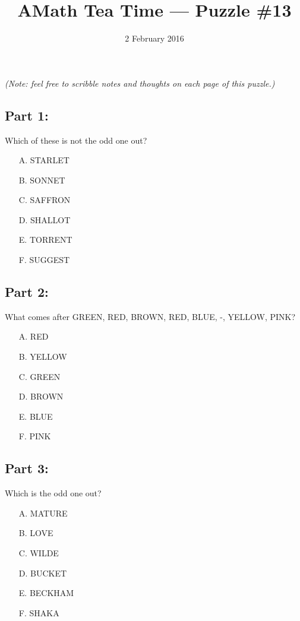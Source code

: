 \documentclass[12pt]{article}
\title{AMath Tea Time --- Puzzle \#13}
\author{}
\date{\vspace{-1cm}2 February 2016}
\begin{document}
\maketitle
{}

{\it \small (Note: feel free to scribble notes and thoughts on each page of this
  puzzle.)}

\subsection*{Part 1:}

Which of these is not the odd one out?
\begin{itemize}
  \item[A.] STARLET
  \item[B.] SONNET
  \item[C.] SAFFRON
  \item[D.] SHALLOT
  \item[E.] TORRENT
  \item[F.] SUGGEST
\end{itemize}

\pagebreak

\subsection*{Part 2:}

What comes after GREEN, RED, BROWN, RED, BLUE, -, YELLOW, PINK?

\begin{itemize}
  \item[A.] RED
  \item[B.] YELLOW
  \item[C.] GREEN
  \item[D.] BROWN
  \item[E.] BLUE
  \item[F.] PINK
\end{itemize}

\pagebreak

\subsection*{Part 3:}

Which is the odd one out?

\begin{itemize}
  \item[A.] MATURE
  \item[B.] LOVE
  \item[C.] WILDE
  \item[D.] BUCKET
  \item[E.] BECKHAM
  \item[F.] SHAKA
\end{itemize}
\end{document}
